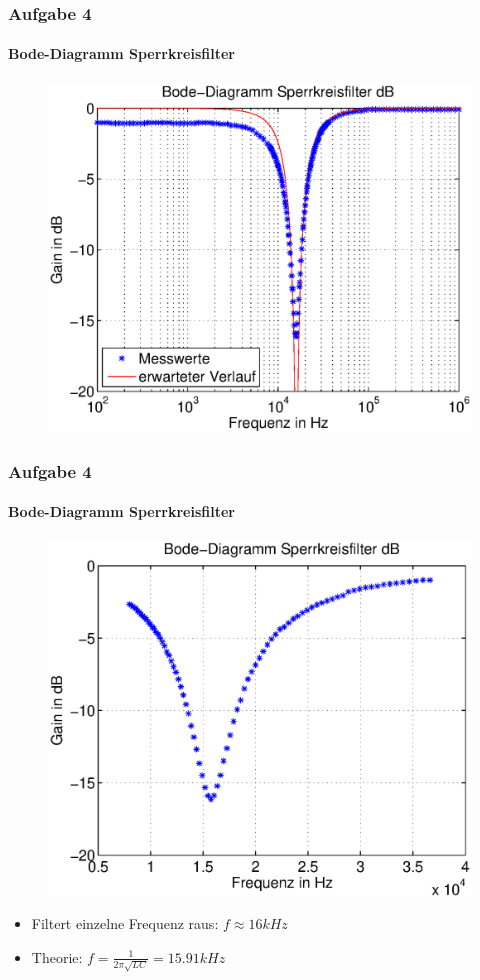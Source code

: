 \begin{frame}
    \frametitle{Aufgabe 4}
    \framesubtitle{Bode-Diagramm Sperrkreisfilter}
     \begin{figure}[H]
     \begin{center}
             \includegraphics[scale=0.55]{./img/4b_dB.eps}
     \end{center}
     \end{figure}
\end{frame}
\begin{frame}
    \frametitle{Aufgabe 4}
    \framesubtitle{Bode-Diagramm Sperrkreisfilter}
     \begin{figure}[H]
     \begin{center}
             \includegraphics[scale=0.45]{./img/4b_Peak.eps}
     \end{center}
     \end{figure}
    \begin{itemize}
        \item Filtert einzelne Frequenz raus: $f \approx 16 kHz$
        \item Theorie: $f= \frac{1}{2\pi \sqrt{LC}}=15.91kHz$
    \end{itemize}
\end{frame}
